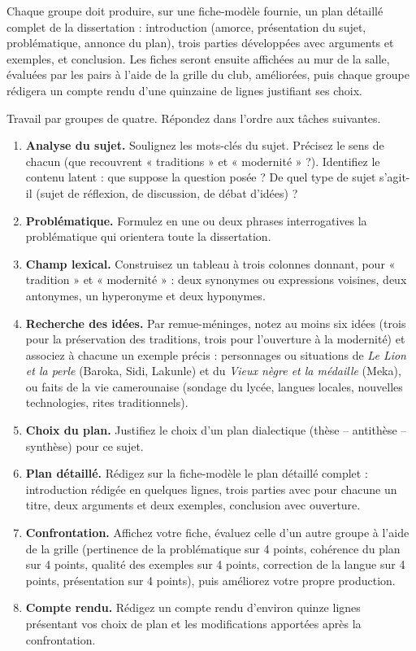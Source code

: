 \documentclass[11pt]{article}
\newcommand{\cle}[1]{{\popxbold\color{popdark}#1}}
\newcounter{popsec}
\newcounter{popsub}
\newcommand{\courssub}[1]{%
  \stepcounter{popsub}%
  \par\vspace{9pt}\noindent{\popxbold\fontsize{11.5}{13}\selectfont\color{popink}{\color{poporange}\thepopsec.\thepopsub}\hspace{6pt}#1}\par\nopagebreak\vspace{4pt}
}
\begin{document}
Chaque groupe doit produire, sur une fiche-modèle fournie, un \cle{plan détaillé} complet de la dissertation : introduction (amorce, présentation du sujet, problématique, annonce du plan), trois parties développées avec arguments et exemples, et conclusion. Les fiches seront ensuite affichées au mur de la salle, évaluées par les pairs à l'aide de la grille du club, améliorées, puis chaque groupe rédigera un compte rendu d'une quinzaine de lignes justifiant ses choix.

\courssub{Consignes}

Travail par groupes de quatre. Répondez dans l'ordre aux tâches suivantes.

\begin{enumerate}
\item \textbf{Analyse du sujet.} Soulignez les mots-clés du sujet. Précisez le sens de chacun (que recouvrent « traditions » et « modernité » ?). Identifiez le contenu latent : que suppose la question posée ? De quel type de sujet s'agit-il (sujet de réflexion, de discussion, de débat d'idées) ?
\item \textbf{Problématique.} Formulez en une ou deux phrases interrogatives la problématique qui orientera toute la dissertation.
\item \textbf{Champ lexical.} Construisez un tableau à trois colonnes donnant, pour « tradition » et « modernité » : deux synonymes ou expressions voisines, deux antonymes, un hyperonyme et deux hyponymes.
\item \textbf{Recherche des idées.} Par remue-méninges, notez au moins six idées (trois pour la préservation des traditions, trois pour l'ouverture à la modernité) et associez à chacune un exemple précis : personnages ou situations de \emph{Le Lion et la perle} (Baroka, Sidi, Lakunle) et du \emph{Vieux nègre et la médaille} (Meka), ou faits de la vie camerounaise (sondage du lycée, langues locales, nouvelles technologies, rites traditionnels).
\item \textbf{Choix du plan.} Justifiez le choix d'un plan dialectique (thèse -- antithèse -- synthèse) pour ce sujet.
\item \textbf{Plan détaillé.} Rédigez sur la fiche-modèle le plan détaillé complet : introduction rédigée en quelques lignes, trois parties avec pour chacune un titre, deux arguments et deux exemples, conclusion avec ouverture.
\item \textbf{Confrontation.} Affichez votre fiche, évaluez celle d'un autre groupe à l'aide de la grille (pertinence de la problématique sur 4 points, cohérence du plan sur 4 points, qualité des exemples sur 4 points, correction de la langue sur 4 points, présentation sur 4 points), puis améliorez votre propre production.
\item \textbf{Compte rendu.} Rédigez un compte rendu d'environ quinze lignes présentant vos choix de plan et les modifications apportées après la confrontation.
\end{enumerate}
\end{document}
